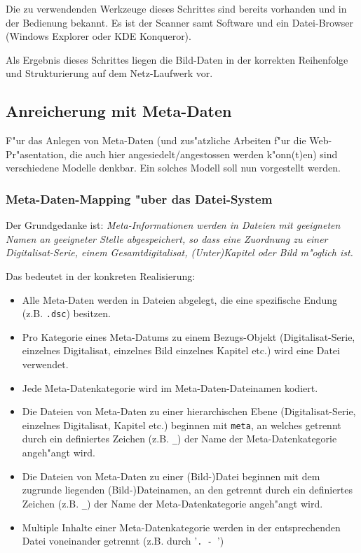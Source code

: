 \documentclass[11pt, twoside, a4paper, BCOR8mm, DIV12, bibtotoc,idxtotoc]{scrreprt}
\begin{document}
Die zu verwendenden Werkzeuge dieses Schrittes sind bereits vorhanden
und in der Bedienung bekannt. Es ist der Scanner samt Software und ein
Datei-Browser (Windows Explorer oder KDE Konqueror).

Als Ergebnis dieses Schrittes liegen die Bild-Daten in der korrekten
Reihenfolge und Strukturierung auf dem Netz-Laufwerk vor.


\subsection{Anreicherung mit Meta-Daten}

F"ur das Anlegen von Meta-Daten (und zus"atzliche Arbeiten f"ur die
Web-Pr"asentation, die auch hier angesiedelt/angestossen werden
k"onn(t)en) sind verschiedene Modelle denkbar. Ein solches Modell soll
nun vorgestellt werden.


\subsubsection{Meta-Daten-Mapping "uber das Datei-System}

Der Grundgedanke ist: \emph{Meta-Informationen werden in Dateien mit
  geeigneten Namen an geeigneter Stelle abgespeichert, so dass eine
  Zuordnung zu einer Digitalisat-Serie, einem Gesamtdigitalisat,
  (Unter)Kapitel oder Bild m"oglich ist.}

Das bedeutet in der konkreten Realisierung:

\begin{itemize}
\item Alle Meta-Daten werden in Dateien abgelegt, die eine spezifische
  Endung (z.B. \texttt{.dsc}) besitzen.
\item Pro Kategorie eines Meta-Datums zu einem Bezugs-Objekt
  (Digitalisat-Serie, einzelnes Digitalisat, einzelnes Bild einzelnes
  Kapitel etc.) wird eine Datei verwendet.
\item Jede Meta-Datenkategorie wird im Meta-Daten-Dateinamen
  kodiert. 
\item Die Dateien von Meta-Daten zu einer hierarchischen Ebene
  (Digitalisat-Serie, einzelnes Digitalisat, Kapitel etc.) beginnen
  mit \texttt{meta},  an welches getrennt durch ein
  definiertes Zeichen (z.B.  \texttt{\_}) der Name der
  Meta-Datenkategorie angeh"angt wird.
\item Die Dateien von Meta-Daten zu einer (Bild-)Datei beginnen mit
  dem zugrunde liegenden (Bild-)Dateinamen, an den getrennt durch ein
  definiertes Zeichen (z.B.  \texttt{\_}) der Name der
  Meta-Datenkategorie angeh"angt wird.
\item Multiple Inhalte einer Meta-Datenkategorie werden in der
  entsprechenden Datei voneinander getrennt (z.B. durch '\texttt{. - }')
\end{itemize}
\end{document}
